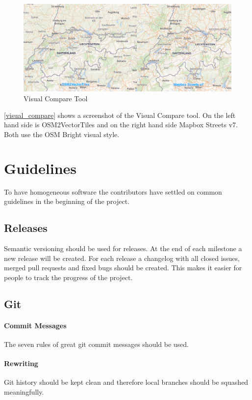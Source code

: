 \begin{figure}[H]
  \centering
  \includegraphics[width=1.0\textwidth]{images/visual_compare}
  \caption{Visual Compare Tool}
  \label{visual_compare} 
\end{figure}

\autoref{visual_compare} shows a screenshot of the Visual Compare tool. On the left hand side is OSM2VectorTiles and on the right hand side Mapbox Streets v7. Both use the OSM Bright visual style.

\section{Guidelines}\label{guidelines}
To have homogeneous software the contributors have settled on common guidelines in the beginning of the project.

\subsection{Releases}
Semantic versioning \cite{pm_7_preston-werner_2015} should be used for releases.
At the end of each milestone a new release will be created. For each release a changelog with all closed issues, merged pull requests and fixed bugs should be created. This makes it easier for people to track the progress of the project.

\subsection{Git}\label{git}
\paragraph{Commit Messages}
The seven rules of great git commit
messages\cite{pm_8_chris.beams.io_2015} should be used.

\paragraph{Rewriting}
Git history should be kept clean and therefore local branches should be squashed meaningfully.

